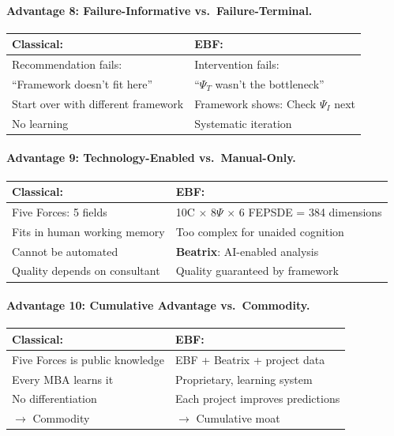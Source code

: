 \paragraph{Advantage 8: Failure-Informative vs.\ Failure-Terminal.}

\begin{center}
\begin{tabular}{@{}p{6.5cm}p{6.5cm}@{}}
\textbf{Classical:} & \textbf{EBF:} \\
\midrule
Recommendation fails: & Intervention fails: \\
``Framework doesn't fit here'' & ``$\Psi_T$ wasn't the bottleneck'' \\
Start over with different framework & Framework shows: Check $\Psi_I$ next \\
No learning & Systematic iteration \\
\end{tabular}
\end{center}

\paragraph{Advantage 9: Technology-Enabled vs.\ Manual-Only.}

\begin{center}
\begin{tabular}{@{}p{6.5cm}p{6.5cm}@{}}
\textbf{Classical:} & \textbf{EBF:} \\
\midrule
Five Forces: 5 fields & 10C $\times$ 8$\Psi$ $\times$ 6 FEPSDE = 384 dimensions \\
Fits in human working memory & Too complex for unaided cognition \\
Cannot be automated & \textbf{Beatrix}: AI-enabled analysis \\
Quality depends on consultant & Quality guaranteed by framework \\
\end{tabular}
\end{center}

\paragraph{Advantage 10: Cumulative Advantage vs.\ Commodity.}

\begin{center}
\begin{tabular}{@{}p{6.5cm}p{6.5cm}@{}}
\textbf{Classical:} & \textbf{EBF:} \\
\midrule
Five Forces is public knowledge & EBF + Beatrix + project data \\
Every MBA learns it & Proprietary, learning system \\
No differentiation & Each project improves predictions \\
$\rightarrow$ Commodity & $\rightarrow$ Cumulative moat \\
\end{tabular}
\end{center}


